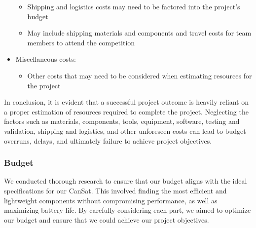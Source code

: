 \begin{itemize}[leftmargin=1cm, itemindent=0.25cm, noitemsep, topsep=0pt, label=$\bullet$]
\begin{itemize}[label=, noitemsep, topsep=1pt]
\item Shipping and logistics costs may need to be factored into the project’s budget
\item May include shipping materials and components and travel costs for team members to attend the competition
\end{itemize}
\item Miscellaneous costs:
\begin{itemize}[label=, noitemsep, topsep=1pt]
\item Other costs that may need to be considered when estimating resources for the project
\end{itemize}
\end{itemize}

In conclusion, it is evident that a successful project outcome is heavily reliant on a proper estimation of resources required to complete the project. Neglecting the factors such as materials, components, tools, equipment, software, testing and validation, shipping and logistics, and other unforeseen costs can lead to budget overruns, delays, and ultimately failure to achieve project objectives.

\subsubsection{Budget}

We conducted thorough research to ensure that our budget aligns with the ideal specifications for our CanSat. This involved finding the most efficient and lightweight components without compromising performance, as well as maximizing battery life. By carefully considering each part, we aimed to optimize our budget and ensure that we could achieve our project objectives.


